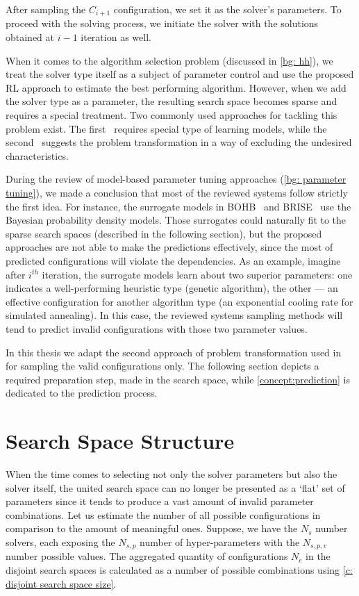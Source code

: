 After sampling the $C_{i+1}$ configuration, we set it as the solver's parameters. To proceed with the solving process, we initiate the solver with the solutions obtained at $i-1$ iteration as well.

When it comes to the algorithm selection problem (discussed in \cref{bg: hh}), we treat the solver type itself as a subject of parameter control and use the proposed RL approach to estimate the best performing algorithm. However, when we add the solver type as a parameter, the resulting search space becomes sparse and requires a special treatment. Two commonly used approaches for tackling this problem exist. The first~\cite{hutter2011sequential,falkner2018bohb,brise2spl} requires special type of learning models, while the second~\cite{lopez2016irace} suggests the problem transformation in a way of excluding the undesired characteristics.

During the review of model-based parameter tuning approaches (\cref{bg: parameter tuning}), we made a conclusion that most of the reviewed systems follow strictly the first idea. For instance, the surrogate models in BOHB~\cite{falkner2018bohb} and BRISE~\cite{brise2spl} use the Bayesian probability density models. Those surrogates could naturally fit to the sparse search spaces (described in the following section), but the proposed approaches are not able to make the predictions effectively, since the most of predicted configurations will violate the dependencies. As an example, imagine after $i^{th}$ iteration, the surrogate models learn about two superior parameters: one indicates a well-performing heuristic type (genetic algorithm), the other — an effective configuration for another algorithm type (an exponential cooling rate for simulated annealing). In this case, the reviewed systems sampling methods will tend to predict invalid configurations with those two parameter values.

In this thesis we adapt the second approach of problem transformation used in~\cite{lopez2016irace} for sampling the valid configurations only. The following section depicts a required preparation step, made in the search space, while \cref{concept:prediction} is dedicated to the prediction process.


\section{Search Space Structure}\label{concept:search space}
When the time comes to selecting not only the solver parameters but also the solver itself, the united search space can no longer be presented as a `flat' set of parameters since it tends to produce a vast amount of invalid parameter combinations. Let us estimate the number of all possible configurations in comparison to the amount of meaningful ones. Suppose, we have the $N_s$ number solvers, each exposing the $N_{s,p}$ number of hyper-parameters with the $N_{s,p,v}$ number possible values. The aggregated quantity of configurations $N_c$ in the disjoint search spaces is calculated as a number of possible combinations using \cref{c: disjoint search space size}.

